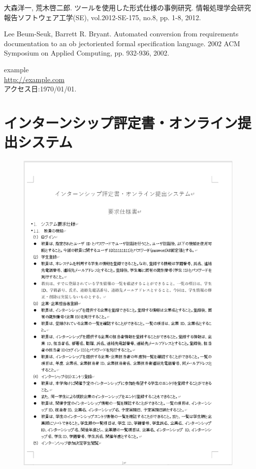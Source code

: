 \documentclass[uplatex, report, a4j, 10pt]{jsbook}
\begin{document}
\begin{thebibliography}{10}
    大森洋一, 荒木啓二郎. 
    ツールを使用した形式仕様の事例研究. 
    情報処理学会研究報告ソフトウェア工学(SE), 
    vol.2012-SE-175, no.8, pp. 1-8, 2012.

    Lee Beum-Seuk, Barrett R. Bryant. 
    Automated conversion from requirements documentation to an ob jectoriented formal speciﬁcation language. 
    2002 ACM Symposium on Applied Computing, pp. 932-936, 2002.

	example\\
	\url{http://example.com}\\アクセス日:1970/01/01.
\end{thebibliography}

\appendix  %

\chapter{インターンシップ評定書・オンライン提出システム}\label{ET_Specifications}

\begin{figure}[tp]
    \begin{center}
    \includegraphics[width=\hsize]{specification/internship_1.eps}
    \end{center}
\end{figure}
\end{document}
